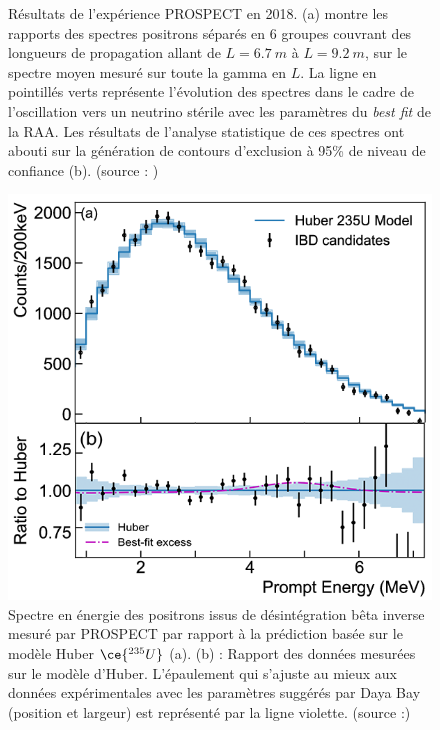 {\begin{figure}[h!]
\begin{subfigure}[b]{0.49\textwidth}
\end{subfigure}
\caption[Résultats de l'expérience PROSPECT en 2018]{Résultats de l'expérience PROSPECT en 2018. (a) montre les rapports des spectres positrons séparés en 6 groupes couvrant des longueurs de propagation allant de $L = \SI{6.7}{m}$ à $L = \SI{9.2}{m}$, sur le spectre moyen mesuré sur toute la gamma en $L$. La ligne en pointillés verts représente l'évolution des spectres dans le cadre de l'oscillation vers un neutrino stérile avec les paramètres du \textit{best fit} de la RAA. Les résultats de l'analyse statistique de ces spectres ont abouti sur la génération de contours d'exclusion à 95\% de niveau de confiance (b). (source : \cite{Ashenfelter:2018iov})}
\label{fig:PROSPECT_results}
\end{figure}

\begin{figure}[h!]
  \centering
  \includegraphics[width=0.6\linewidth]{images/PROSPECT_pureU5.png}
  \caption[Spectre en énergie des positrons issus de la désintégration bêta inverse mesuré par PROSPECT par rapport à la prédiction basée sur le modèle Huber $\ce{^{235}U}$]{Spectre en énergie des positrons issus de désintégration bêta inverse mesuré par PROSPECT par rapport à la prédiction basée sur le modèle Huber $\ce{^{235}U}$ (a). (b) : Rapport des données mesurées sur le modèle d'Huber. L'épaulement qui s'ajuste au mieux aux données expérimentales avec les paramètres suggérés par Daya Bay (position et largeur) est représenté par la ligne violette. (source :\cite{Ashenfelter:2018jrx})}
  \label{fig:PROSPECT_pureU5.png}
\end{figure}

}

